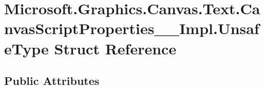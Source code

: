 \hypertarget{struct_microsoft_1_1_graphics_1_1_canvas_1_1_text_1_1_canvas_script_properties_____impl_1_1_unsafe_type}{}\section{Microsoft.\+Graphics.\+Canvas.\+Text.\+Canvas\+Script\+Properties\+\_\+\+\_\+\+Impl.\+Unsafe\+Type Struct Reference}
\label{struct_microsoft_1_1_graphics_1_1_canvas_1_1_text_1_1_canvas_script_properties_____impl_1_1_unsafe_type}
\subsection*{Public Attributes}
